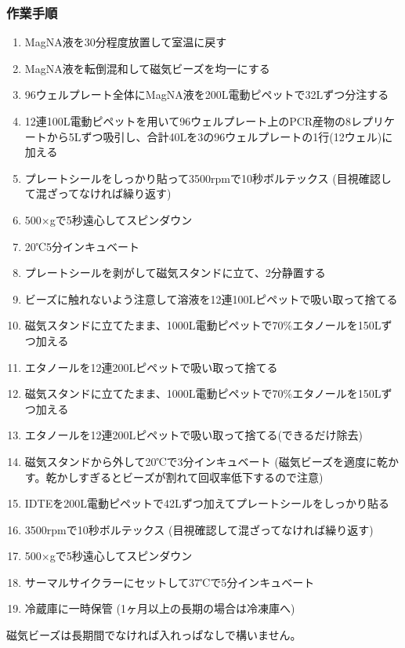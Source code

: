 \documentclass[titlepage,10pt,a4paper]{jsbook}
\begin{document}
\subsubsection{作業手順}
\begin{enumerate}
\item MagNA液を30分程度放置して室温に戻す
\item MagNA液を転倒混和して磁気ビーズを均一にする
\item 96ウェルプレート全体にMagNA液を200{\textmu}L電動ピペットで32{\textmu}Lずつ分注する
\item 12連100{\textmu}L電動ピペットを用いて96ウェルプレート上のPCR産物の8レプリケートから5{\textmu}Lずつ吸引し、合計40{\textmu}Lを3の96ウェルプレートの1行(12ウェル)に加える
\item プレートシールをしっかり貼って3500rpmで10秒ボルテックス (目視確認して混ざってなければ繰り返す)
\item 500×gで5秒遠心してスピンダウン
\item 20℃5分インキュベート
\item プレートシールを剥がして磁気スタンドに立て、2分静置する
\item ビーズに触れないよう注意して溶液を12連100{\textmu}Lピペットで吸い取って捨てる
\item 磁気スタンドに立てたまま、1000{\textmu}L電動ピペットで70\%エタノールを150{\textmu}Lずつ加える
\item エタノールを12連200{\textmu}Lピペットで吸い取って捨てる
\item 磁気スタンドに立てたまま、1000{\textmu}L電動ピペットで70\%エタノールを150{\textmu}Lずつ加える
\item エタノールを12連200{\textmu}Lピペットで吸い取って捨てる(できるだけ除去)
\item 磁気スタンドから外して20℃で3分インキュベート (磁気ビーズを適度に乾かす。乾かしすぎるとビーズが割れて回収率低下するので注意)
\item IDTEを200{\textmu}L電動ピペットで42{\textmu}Lずつ加えてプレートシールをしっかり貼る
\item 3500rpmで10秒ボルテックス (目視確認して混ざってなければ繰り返す)
\item 500×gで5秒遠心してスピンダウン
\item サーマルサイクラーにセットして37℃で5分インキュベート
\item 冷蔵庫に一時保管 (1ヶ月以上の長期の場合は冷凍庫へ)
\end{enumerate}

磁気ビーズは長期間でなければ入れっぱなしで構いません。
\end{document}
